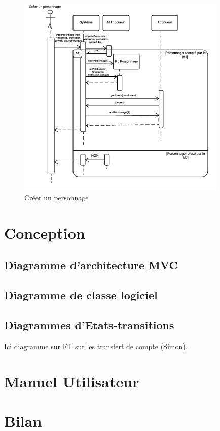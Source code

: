 \documentclass[a4paper,oneside,10pt]{article}
\begin{document}
\begin{figure}[H]
	\begin{center}
		\includegraphics[width=10cm]{images/sequence/DS-CreerPerso.png}  
		\caption{Créer un personnage}
	\end{center}
\end{figure}
\section{Conception}
\subsection{Diagramme d'architecture MVC}
\subsection{Diagramme de classe logiciel}

\subsection{Diagrammes d'Etats-transitions}
Ici diagramme sur ET sur les transfert de compte (Simon).


\section{Manuel Utilisateur}


\section{Bilan}
\end{document}
